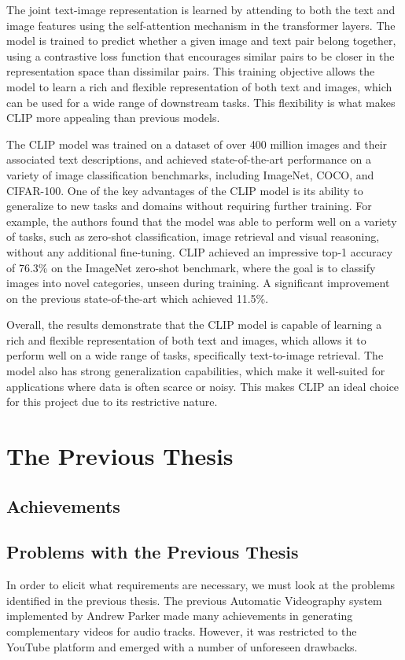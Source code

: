 \documentclass{l4proj}
\begin{document}
The joint text-image representation is learned by attending to both the text and image features using the self-attention mechanism in the transformer layers. The model is trained to predict whether a given image and text pair belong together, using a contrastive loss function that encourages similar pairs to be closer in the representation space than dissimilar pairs. This training objective allows the model to learn a rich and flexible representation of both text and images, which can be used for a wide range of downstream tasks. This flexibility is what makes CLIP more appealing than previous models.

The CLIP model was trained on a dataset of over 400 million images and their associated text descriptions, and achieved state-of-the-art performance on a variety of image classification benchmarks, including ImageNet, COCO, and CIFAR-100. One of the key advantages of the CLIP model is its ability to generalize to new tasks and domains without requiring further training. For example, the authors found that the model was able to perform well on a variety of tasks, such as zero-shot classification, image retrieval and visual reasoning, without any additional fine-tuning. CLIP achieved an impressive top-1 accuracy of 76.3\% on the ImageNet zero-shot benchmark, where the goal is to classify images into novel categories, unseen during training. A significant improvement on the previous state-of-the-art which achieved 11.5\%.

Overall, the results demonstrate that the CLIP model is capable of learning a rich and flexible representation of both text and images, which allows it to perform well on a wide range of tasks, specifically text-to-image retrieval. The model also has strong generalization capabilities, which make it well-suited for applications where data is often scarce or noisy. This makes CLIP an ideal choice for this project due to its restrictive nature.


\section{The Previous Thesis}
\label{sec:background_parker}
\subsection{Achievements}
\subsection{Problems with the Previous Thesis}
In order to elicit what requirements are necessary, we must look at the problems identified in the previous thesis.
The previous Automatic Videography system implemented by Andrew Parker made many achievements in generating complementary videos for audio tracks. However, it was restricted to the YouTube platform and emerged with a number of unforeseen drawbacks. 
\end{document}
